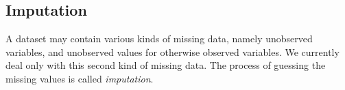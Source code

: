 \documentclass{article}\usepackage[]{graphicx}\usepackage[]{color}
\newcommand{\Robject}[1]{{\texttt{#1}}}
\newcommand{\Rmethod}[1]{{\texttt{#1}}}
\newcommand{\Rclass}[1]{{\textit{#1}}}
\begin{document}
% 
% 
% 
% 
% 

\subsection{Imputation}
A dataset may contain various kinds of missing data, namely unobserved variables,
and unobserved values for otherwise observed variables. We currently deal only with this
second kind of missing data. The process of guessing the missing values is called \emph{imputation}.
\end{document}
